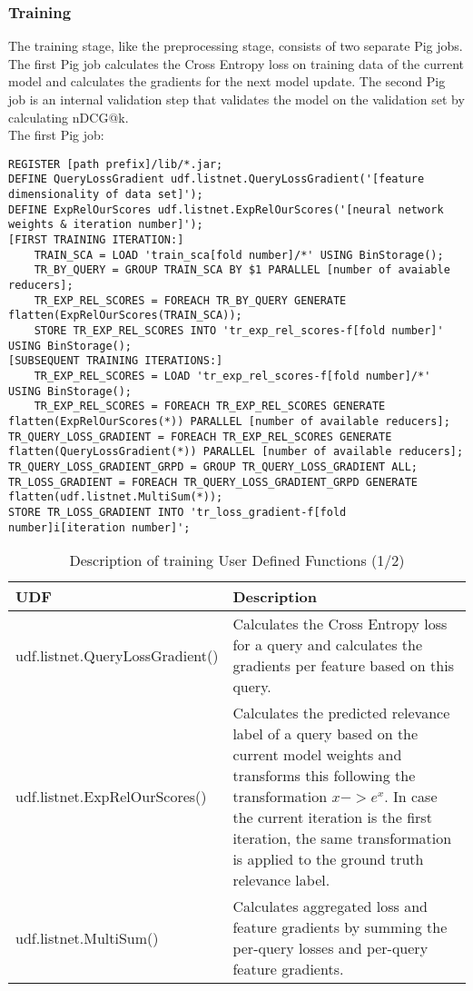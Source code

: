 \subsubsection{Training}
The training stage, like the preprocessing stage, consists of two separate Pig jobs. The first Pig job calculates the Cross Entropy loss on training data of the current model and calculates the gradients for the next model update. The second Pig job is an internal validation step that validates the model on the validation set by calculating \ac{nDCG}@k.\\

The first Pig job:\\
\begin{minipage}{\linewidth}
\begin{lstlisting}
REGISTER [path prefix]/lib/*.jar;
DEFINE QueryLossGradient udf.listnet.QueryLossGradient('[feature dimensionality of data set]');
DEFINE ExpRelOurScores udf.listnet.ExpRelOurScores('[neural network weights & iteration number]');
[FIRST TRAINING ITERATION:]
	TRAIN_SCA = LOAD 'train_sca[fold number]/*' USING BinStorage();
	TR_BY_QUERY = GROUP TRAIN_SCA BY $1 PARALLEL [number of avaiable reducers];
	TR_EXP_REL_SCORES = FOREACH TR_BY_QUERY GENERATE flatten(ExpRelOurScores(TRAIN_SCA));
	STORE TR_EXP_REL_SCORES INTO 'tr_exp_rel_scores-f[fold number]' USING BinStorage();
[SUBSEQUENT TRAINING ITERATIONS:]
	TR_EXP_REL_SCORES = LOAD 'tr_exp_rel_scores-f[fold number]/*' USING BinStorage();
	TR_EXP_REL_SCORES = FOREACH TR_EXP_REL_SCORES GENERATE flatten(ExpRelOurScores(*)) PARALLEL [number of available reducers];
TR_QUERY_LOSS_GRADIENT = FOREACH TR_EXP_REL_SCORES GENERATE flatten(QueryLossGradient(*)) PARALLEL [number of available reducers];
TR_QUERY_LOSS_GRADIENT_GRPD = GROUP TR_QUERY_LOSS_GRADIENT ALL;
TR_LOSS_GRADIENT = FOREACH TR_QUERY_LOSS_GRADIENT_GRPD GENERATE flatten(udf.listnet.MultiSum(*));
STORE TR_LOSS_GRADIENT INTO 'tr_loss_gradient-f[fold number]i[iteration number]';
\end{lstlisting}
\end{minipage}

\begin{table}
\centering
\begin{tabular}{p{5cm}p{8cm}}\toprule
UDF & Description \\
\midrule
udf.listnet.QueryLossGradient() & Calculates the Cross Entropy loss for a query and calculates the gradients per feature based on this query.\\
udf.listnet.ExpRelOurScores() & Calculates the predicted relevance label of a query based on the current model weights and transforms this following the transformation $x -> e^{x}$. In case the current iteration is the first iteration, the same transformation is applied to the ground truth relevance label.\\
udf.listnet.MultiSum() & Calculates aggregated loss and feature gradients by summing the per-query losses and per-query feature gradients.\\
\bottomrule
\end{tabular}
\caption{Description of training User Defined Functions (1/2)}
\label{tbl:training_udfs_1}
\end{table}

